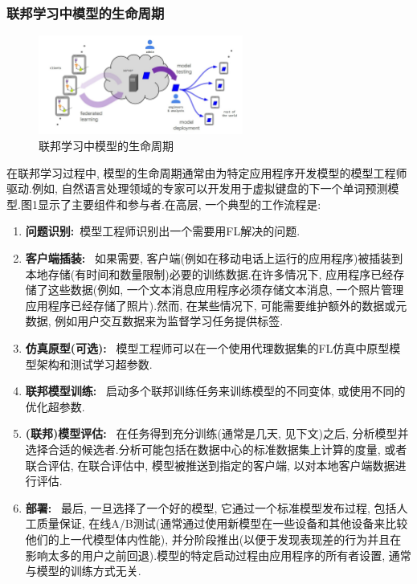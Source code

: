 \documentclass[a4paper]{article}
\theoremstyle{definition}
\numberwithin{equation}{section}
\begin{document}
    \subsubsection{联邦学习中模型的生命周期}
    \begin{figure}[ht]
        \setlength{\abovecaptionskip}{0.1cm}
        \centering    
        \includegraphics[width=0.6\textwidth]{life_circle.jpg}
        \caption{联邦学习中模型的生命周期}
    \end{figure}
在联邦学习过程中, 模型的生命周期通常由为特定应用程序开发模型的模型工程师驱动.例如, 自然语言处理领域的专家可以开发用于虚拟键盘的下一个单词预测模型.图1显示了主要组件和参与者.在高层, 一个典型的工作流程是:
\begin{enumerate}
\item	\textbf{问题识别:}\ 模型工程师识别出一个需要用FL解决的问题.
\item	\textbf{客户端插装:} \ 如果需要, 客户端(例如在移动电话上运行的应用程序)被插装到本地存储(有时间和数量限制)必要的训练数据.在许多情况下, 应用程序已经存储了这些数据(例如, 一个文本消息应用程序必须存储文本消息, 一个照片管理应用程序已经存储了照片).然而, 在某些情况下, 可能需要维护额外的数据或元数据, 例如用户交互数据来为监督学习任务提供标签.
\item	\textbf{仿真原型(可选):} \ 模型工程师可以在一个使用代理数据集的FL仿真中原型模型架构和测试学习超参数.
\item	\textbf{联邦模型训练:} \ 启动多个联邦训练任务来训练模型的不同变体, 或使用不同的优化超参数.
\item	\textbf{(联邦)模型评估:} \ 在任务得到充分训练(通常是几天, 见下文)之后, 分析模型并选择合适的候选者.分析可能包括在数据中心的标准数据集上计算的度量, 或者联合评估, 在联合评估中, 模型被推送到指定的客户端, 以对本地客户端数据进行评估.
\item	\textbf{部署:} \ 最后, 一旦选择了一个好的模型, 它通过一个标准模型发布过程, 包括人工质量保证, 在线A/B测试(通常通过使用新模型在一些设备和其他设备来比较他们的上一代模型体内性能), 并分阶段推出(以便于发现表现差的行为并且在影响太多的用户之前回退).模型的特定启动过程由应用程序的所有者设置, 通常与模型的训练方式无关.
\end{enumerate}
 
\end{document}
